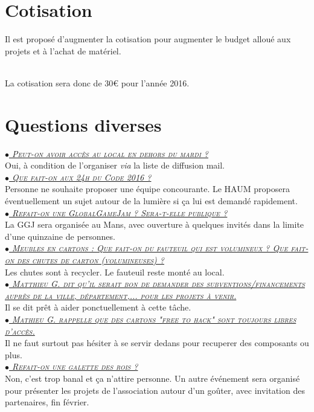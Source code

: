 \documentclass[a4paper, 11pt]{article}
\newcommand\question[2]{\noindent\ul{\textit{\textsc{$\bullet$ #1}}}\\#2\\}
\begin{document}



\section{Cotisation}

Il est proposé d'augmenter la cotisation pour augmenter le budget alloué aux projets et à l'achat de matériel.

~\\ La cotisation sera donc de 30\euro{} pour l'année 2016.


\section{Questions diverses}

\question{Peut-on avoir accès au local en dehors du mardi ?}{Oui, à condition de
l'organiser \textit{via} la liste de diffusion mail.}
\question{Que fait-on aux 24h du Code 2016 ?}{Personne ne souhaite proposer une équipe concourante. Le HAUM proposera
éventuellement un sujet autour de la lumière si ça lui est demandé rapidement.}
\question{Refait-on une GlobalGameJam ? Sera-t-elle publique ?}{La GGJ sera
organisée au Mans, avec ouverture à quelques invités dans la limite d'une quinzaine de personnes.}
\question{Meubles en cartons : Que fait-on du fauteuil qui est volumineux ? Que
fait-on des chutes de carton (volumineuses) ?}{Les chutes sont à recycler. Le
fauteuil reste monté au local.}
\question{Matthieu G. dit qu'il serait bon de demander des
subventions/financements auprès de la ville, département,... pour les projets
à venir.}{Il se dit prêt à aider ponctuellement à cette tâche.}
\question{Mathieu G. rappelle que des cartons "free to hack" sont toujours libres d'accès.}{Il ne faut surtout pas hésiter à se servir dedans pour recuperer des composants
ou plus.}
\question{Refait-on une galette des rois ?}{Non, c'est trop banal et ça
n'attire personne. Un autre événement sera organisé pour présenter les projets
de l'association autour d'un goûter, avec invitation des partenaires, fin février.}
\end{document}
